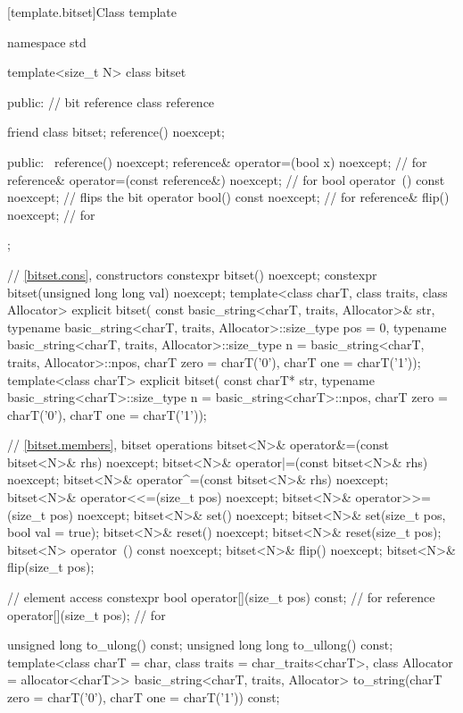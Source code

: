 [template.bitset]{Class template }%
%
\begin{codeblock}
namespace std {
  template<size_t N> class bitset {
  public:
    // bit reference
    class reference {
      friend class bitset;
      reference() noexcept;

    public:
      ~reference() noexcept;
      reference& operator=(bool x) noexcept;            // for 
      reference& operator=(const reference&) noexcept;  // for 
      bool operator~() const noexcept;                  // flips the bit
      operator bool() const noexcept;                   // for 
      reference& flip() noexcept;                       // for 
    };

    // \ref{bitset.cons}, constructors
    constexpr bitset() noexcept;
    constexpr bitset(unsigned long long val) noexcept;
    template<class charT, class traits, class Allocator>
      explicit bitset(
        const basic_string<charT, traits, Allocator>& str,
        typename basic_string<charT, traits, Allocator>::size_type pos = 0,
        typename basic_string<charT, traits, Allocator>::size_type n
          = basic_string<charT, traits, Allocator>::npos,
        charT zero = charT('0'),
        charT one = charT('1'));
    template<class charT>
      explicit bitset(
        const charT* str,
        typename basic_string<charT>::size_type n = basic_string<charT>::npos,
        charT zero = charT('0'),
        charT one = charT('1'));

    // \ref{bitset.members}, bitset operations
    bitset<N>& operator&=(const bitset<N>& rhs) noexcept;
    bitset<N>& operator|=(const bitset<N>& rhs) noexcept;
    bitset<N>& operator^=(const bitset<N>& rhs) noexcept;
    bitset<N>& operator<<=(size_t pos) noexcept;
    bitset<N>& operator>>=(size_t pos) noexcept;
    bitset<N>& set() noexcept;
    bitset<N>& set(size_t pos, bool val = true);
    bitset<N>& reset() noexcept;
    bitset<N>& reset(size_t pos);
    bitset<N>  operator~() const noexcept;
    bitset<N>& flip() noexcept;
    bitset<N>& flip(size_t pos);

    // element access
    constexpr bool operator[](size_t pos) const;        // for 
    reference operator[](size_t pos);                   // for 

    unsigned long to_ulong() const;
    unsigned long long to_ullong() const;
    template<class charT = char,
              class traits = char_traits<charT>,
              class Allocator = allocator<charT>>
      basic_string<charT, traits, Allocator>
        to_string(charT zero = charT('0'), charT one = charT('1')) const;

}}
\end{codeblock}
